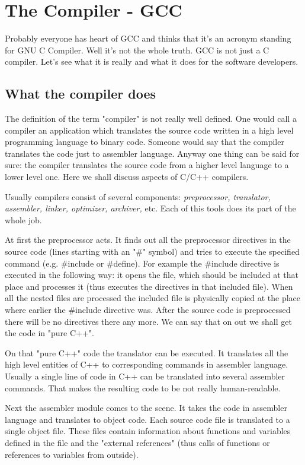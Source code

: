 
\section{The Compiler - GCC}
\label{gcc}
Probably everyone has heart of GCC and thinks that it's an acronym standing for GNU C Compiler. Well it's not the whole truth. GCC is not just a C compiler. Let's see what it is really and what it does for the software developers.

\subsection{What the compiler does}
The definition of the term "compiler" is not really well defined. One would call a compiler an application which translates the source code written in a high level programming language to binary code. Someone would say that the compiler translates the code just to assembler language. Anyway one thing can be said for sure: the compiler translates the source code from a higher level language to a lower level one. Here we shall discuss aspects of C/C++ compilers.

Usually compilers consist of several components: \textit {preprocessor, translator, assembler, linker, optimizer, archiver,} etc. Each of this tools does its part of the whole job. 

At first the preprocessor acts. It finds out all the preprocessor directives in the source code (lines starting with an "\#" symbol) and tries to execute the specified command (e.g. \#include or \#define). For example the \#include directive is executed in the following way: it opens the file, which should be included at that place and processes it (thus executes the directives in that included file). When all the nested files are processed the included file is physically copied at the place where earlier the \#include directive was. After the source code is preprocessed there will be no directives there any more. We can say that on out we shall get the code in "pure C++". 

On that "pure C++" code the translator can be executed. It translates all the high level entities of C++ to corresponding commands in assembler language. Usually a single line of code in C++ can be translated into several assembler commands. That makes the resulting code to be not really human-readable.

Next the assembler module comes to the scene. It takes the code in assembler language and translates to object code. Each source code file is translated to a single object file. These files contain information about functions and variables defined in the file and the "external references" (thus calls of functions or references to variables from outside).

